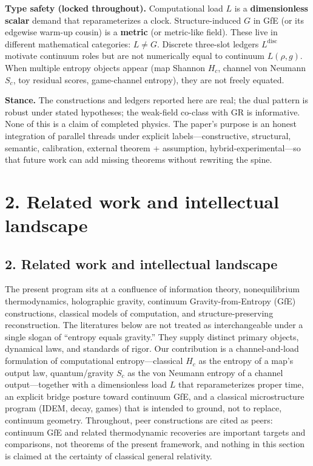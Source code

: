 \documentclass[
  11pt,
]{article}
\newcounter{none} %
\begin{document}
\textbf{Type safety (locked throughout).} Computational load \(L\) is a \textbf{dimensionless scalar} demand that reparameterizes a clock. Structure-induced \(G\) in GfE (or its edgewise warm-up cousin) is a \textbf{metric} (or metric-like field). These live in different mathematical categories: \textbf{\(L\neq G\)}. Discrete three-slot ledgers \(L^{\mathrm{disc}}\) motivate continuum roles but are not numerically equal to continuum \(L(\rho,g)\). When multiple entropy objects appear (map Shannon \(H_c\), channel von Neumann \(S_c\), toy residual scores, game-channel entropy), they are not freely equated.

\textbf{Stance.} The constructions and ledgers reported here are real; the dual pattern is robust under stated hypotheses; the weak-field co-class with GR is informative. None of this is a claim of completed physics. The paper's purpose is an honest integration of parallel threads under explicit labels---constructive, structural, semantic, calibration, external theorem + assumption, hybrid-experimental---so that future work can add missing theorems without rewriting the spine.

\section{2. Related work and intellectual landscape}\label{related-work-and-intellectual-landscape}

\subsection{2. Related work and intellectual landscape}\label{related-work-and-intellectual-landscape-1}

The present program sits at a confluence of information theory, nonequilibrium thermodynamics, holographic gravity, continuum Gravity-from-Entropy (GfE) constructions, classical models of computation, and structure-preserving reconstruction. The literatures below are not treated as interchangeable under a single slogan of ``entropy equals gravity.'' They supply distinct primary objects, dynamical laws, and standards of rigor. Our contribution is a channel-and-load formulation of computational entropy---classical \(H_c\) as the entropy of a map's output law, quantum/gravity \(S_c\) as the von Neumann entropy of a channel output---together with a dimensionless load \(L\) that reparameterizes proper time, an explicit bridge posture toward continuum GfE, and a classical microstructure program (IDEM, decay, games) that is intended to ground, not to replace, continuum geometry. Throughout, peer constructions are cited as peers: continuum GfE and related thermodynamic recoveries are important targets and comparisons, not theorems of the present framework, and nothing in this section is claimed at the certainty of classical general relativity.
\end{document}
